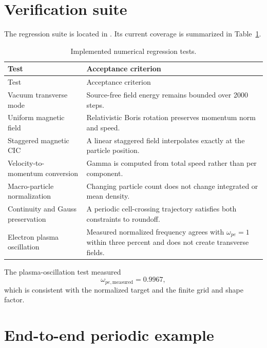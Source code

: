\documentclass[11pt,a4paper]{article}
\begin{document}
\section{Verification suite}

The regression suite is located in .  Its current
coverage is summarized in Table~\ref{tab:tests}.

\begin{longtable}{p{}p{}}
\caption{Implemented numerical regression tests.}\label{tab:tests}\\
\toprule
Test & Acceptance criterion \\
\midrule
\endfirsthead
\toprule
Test & Acceptance criterion \\
\midrule
\endhead
Vacuum transverse mode & Source-free field energy remains bounded over 2000 steps. \\
Uniform magnetic field & Relativistic Boris rotation preserves momentum norm and speed. \\
Staggered magnetic CIC & A linear staggered field interpolates exactly at the particle position. \\
Velocity-to-momentum conversion & Gamma is computed from total speed rather than per component. \\
Macro-particle normalization & Changing particle count does not change integrated or mean density. \\
Continuity and Gauss preservation & A periodic cell-crossing trajectory satisfies both constraints to roundoff. \\
Electron plasma oscillation & Measured normalized frequency agrees with $\omega_{pe}=1$ within three percent and does not create transverse fields. \\
\bottomrule
\end{longtable}

The plasma-oscillation test measured
\begin{equation}
  \omega_{pe,\mathrm{measured}}=0.9967,
\end{equation}
which is consistent with the normalized target and the finite grid and shape
factor.

\section{End-to-end periodic example}
\end{document}
